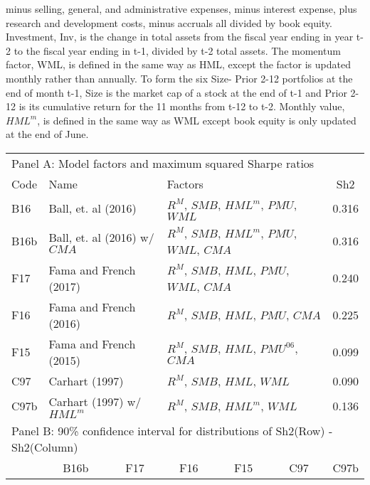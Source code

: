 \begin{table}[!ht]
{{minus selling, general, and administrative expenses, minus interest expense,
plus research and development costs, minus accruals all divided by book equity.
Investment, Inv, is the change in total assets from the fiscal year ending in
year t-2 to the fiscal year ending in t-1, divided by t-2 total assets. The
momentum factor, WML, is defined in the same way as HML, except the factor is
updated monthly rather than annually. To form the six Size- Prior 2-12
portfolios at the end of month t-1, Size is the market cap of a stock at the
end of t-1 and Prior 2-12 is its cumulative return for the 11 months from t-12
to t-2. Monthly value, $HML^m$, is defined in the same way as WML except book
equity is only updated at the end of June.
}
}
\begin{tabular}{lcccccc}
  \toprule
  \multicolumn{7}{l}{Panel A: Model factors and maximum squared Sharpe ratios} \\
  Code  & \multicolumn{2}{l}{Name}                         & \multicolumn{3}{l}{Factors}                                   & Sh2   \\
  B16   & \multicolumn{2}{l}{Ball, et. al (2016)}          & \multicolumn{3}{l}{$R^M$, $SMB$, $HML^m$, $PMU$, $WML$}        & 0.316 \\
  B16b  & \multicolumn{2}{l}{Ball, et. al (2016) w/ $CMA$} & \multicolumn{3}{l}{$R^M$, $SMB$, $HML^m$, $PMU$, $WML$, $CMA$} & 0.316 \\
  F17   & \multicolumn{2}{l}{Fama and French (2017)}       & \multicolumn{3}{l}{$R^M$, $SMB$, $HML$, $PMU$, $WML$, $CMA$}   & 0.240 \\
  F16   & \multicolumn{2}{l}{Fama and French (2016)}       & \multicolumn{3}{l}{$R^M$, $SMB$, $HML$, $PMU$, $CMA$}          & 0.225 \\
  F15   & \multicolumn{2}{l}{Fama and French (2015)}       & \multicolumn{3}{l}{$R^M$, $SMB$, $HML$, $PMU^{06}$, $CMA$}     & 0.099 \\
  C97   & \multicolumn{2}{l}{Carhart (1997)}               & \multicolumn{3}{l}{$R^M$, $SMB$, $HML$, $WML$}                 & 0.090 \\
  C97b  & \multicolumn{2}{l}{Carhart (1997) w/ $HML^m$}    & \multicolumn{3}{l}{$R^M$, $SMB$, $HML^m$, $WML$}               & 0.136 \\
  \midrule
  \multicolumn{7}{l}{Panel B: 90\% confidence interval for distributions of Sh2(Row) - Sh2(Column)} \\
        &        B16b      &        F17       &        F16       &        F15       &        C97       &        C97b      \\

\end{tabular}
\end{table}
